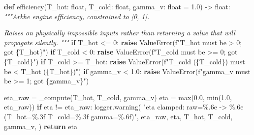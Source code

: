 \documentclass[
  11pt]{report}
\newenvironment{Shaded}{}{}
\newcommand{\BuiltInTok}[1]{\textcolor[rgb]{0.00,0.50,0.00}{#1}}
\newcommand{\CommentTok}[1]{\textcolor[rgb]{0.38,0.63,0.69}{\textit{#1}}}
\newcommand{\ControlFlowTok}[1]{\textcolor[rgb]{0.00,0.44,0.13}{\textbf{#1}}}
\newcommand{\DecValTok}[1]{\textcolor[rgb]{0.25,0.63,0.44}{#1}}
\newcommand{\FloatTok}[1]{\textcolor[rgb]{0.25,0.63,0.44}{#1}}
\newcommand{\KeywordTok}[1]{\textcolor[rgb]{0.00,0.44,0.13}{\textbf{#1}}}
\newcommand{\NormalTok}[1]{#1}
\newcommand{\OperatorTok}[1]{\textcolor[rgb]{0.40,0.40,0.40}{#1}}
\newcommand{\PreprocessorTok}[1]{\textcolor[rgb]{0.74,0.48,0.00}{#1}}
\newcommand{\SpecialCharTok}[1]{\textcolor[rgb]{0.25,0.44,0.63}{#1}}
\newcommand{\SpecialStringTok}[1]{\textcolor[rgb]{0.73,0.40,0.53}{#1}}
\newcommand{\StringTok}[1]{\textcolor[rgb]{0.25,0.44,0.63}{#1}}
\begin{document}
\begin{Shaded}
\begin{Highlighting}[]
\KeywordTok{def}\NormalTok{ efficiency(T\_hot: }\BuiltInTok{float}\NormalTok{, T\_cold: }\BuiltInTok{float}\NormalTok{, gamma\_v: }\BuiltInTok{float} \OperatorTok{=} \FloatTok{1.0}\NormalTok{) }\OperatorTok{{-}\textgreater{}} \BuiltInTok{float}\NormalTok{:}
    \CommentTok{"""Arkhe engine efficiency, constrained to [0, 1].}

\CommentTok{    Raises on physically impossible inputs rather than}
\CommentTok{    returning a value that will propagate silently.}
\CommentTok{    """}
    \ControlFlowTok{if}\NormalTok{ T\_hot }\OperatorTok{\textless{}=} \DecValTok{0}\NormalTok{:}
        \ControlFlowTok{raise} \PreprocessorTok{ValueError}\NormalTok{(}\SpecialStringTok{f"T\_hot must be \textgreater{} 0; got }\SpecialCharTok{\{}\NormalTok{T\_hot}\SpecialCharTok{\}}\SpecialStringTok{"}\NormalTok{)}
    \ControlFlowTok{if}\NormalTok{ T\_cold }\OperatorTok{\textless{}} \DecValTok{0}\NormalTok{:}
        \ControlFlowTok{raise} \PreprocessorTok{ValueError}\NormalTok{(}\SpecialStringTok{f"T\_cold must be \textgreater{}= 0; got }\SpecialCharTok{\{}\NormalTok{T\_cold}\SpecialCharTok{\}}\SpecialStringTok{"}\NormalTok{)}
    \ControlFlowTok{if}\NormalTok{ T\_cold }\OperatorTok{\textgreater{}=}\NormalTok{ T\_hot:}
        \ControlFlowTok{raise} \PreprocessorTok{ValueError}\NormalTok{(}\SpecialStringTok{f"T\_cold (}\SpecialCharTok{\{}\NormalTok{T\_cold}\SpecialCharTok{\}}\SpecialStringTok{) must be \textless{} T\_hot (}\SpecialCharTok{\{}\NormalTok{T\_hot}\SpecialCharTok{\}}\SpecialStringTok{)"}\NormalTok{)}
    \ControlFlowTok{if}\NormalTok{ gamma\_v }\OperatorTok{\textless{}} \FloatTok{1.0}\NormalTok{:}
        \ControlFlowTok{raise} \PreprocessorTok{ValueError}\NormalTok{(}\SpecialStringTok{f"gamma\_v must be \textgreater{}= 1; got }\SpecialCharTok{\{}\NormalTok{gamma\_v}\SpecialCharTok{\}}\SpecialStringTok{"}\NormalTok{)}

\NormalTok{    eta\_raw }\OperatorTok{=}\NormalTok{ \_compute(T\_hot, T\_cold, gamma\_v)}
\NormalTok{    eta }\OperatorTok{=} \BuiltInTok{max}\NormalTok{(}\FloatTok{0.0}\NormalTok{, }\BuiltInTok{min}\NormalTok{(}\FloatTok{1.0}\NormalTok{, eta\_raw))}
    \ControlFlowTok{if}\NormalTok{ eta }\OperatorTok{!=}\NormalTok{ eta\_raw:}
\NormalTok{        logger.warning(}
            \StringTok{"eta clamped: raw=}\SpecialCharTok{\%.6e}\StringTok{ {-}\textgreater{} }\SpecialCharTok{\%.6e}\StringTok{ (T\_hot=}\SpecialCharTok{\%.3f}\StringTok{ T\_cold=}\SpecialCharTok{\%.3f}\StringTok{ gamma=}\SpecialCharTok{\%.6f}\StringTok{)"}\NormalTok{,}
\NormalTok{            eta\_raw, eta, T\_hot, T\_cold, gamma\_v,}
\NormalTok{        )}
    \ControlFlowTok{return}\NormalTok{ eta}
\end{Highlighting}
\end{Shaded}
\end{document}

